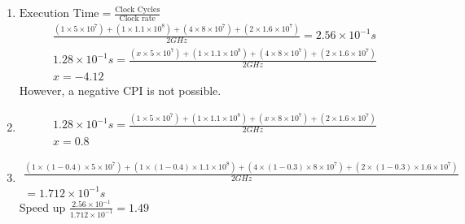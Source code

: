 \documentclass{article}
\def\math#1{$#1$}
\begin{document}
\begin{enumerate}[(1)]
    \item \math{\text{Execution Time} = \frac{\text{Clock Cycles}}{\text{Clock rate}}}
        \begin{equation}
            \begin{split}
               \frac{(1 \times 5 \times 10^7) + (1 \times 1.1 \times 10^8) + (4 \times 8 \times 10^7) + (2 \times 1.6 \times 10^7)}{2GHz} = 2.56 \times 10^{-1} s\\
               1.28 \times 10^{-1}s = \frac{(x \times 5 \times 10^7) + (1 \times 1.1 \times 10^8) + (4 \times 8 \times 10^7) + (2 \times 1.6 \times 10^7)}{2GHz} \\
               x = -4.12
            \end{split}
        \end{equation}
        However, a negative CPI is not possible. 
    \item 
        \begin{equation}
            \begin{split}
               1.28 \times 10^{-1}s = \frac{(1 \times 5 \times 10^7) + (1 \times 1.1 \times 10^8) + (x \times 8 \times 10^7) + (2 \times 1.6 \times 10^7)}{2GHz} \\
               x = 0.8
            \end{split}
        \end{equation}
    \item  \begin{equation}
                \begin{split}
                   \frac{(1 \times (1 - 0.4) \times 5 \times 10^7) + (1 \times (1 - 0.4) \times 1.1 \times 10^8) + (4 \times (1 - 0.3) \times 8 \times 10^7) + (2 \times (1 - 0.3) \times 1.6 \times 10^7)}{2GHz} \\
                   = 1.712 \times 10^{-1} s
                \end{split}
            \end{equation}
        Speed up \math{\frac{2.56 \times 10^{-1}}{1.712 \times 10^{-1}} = 1.49}
\end{enumerate}
\end{document}
